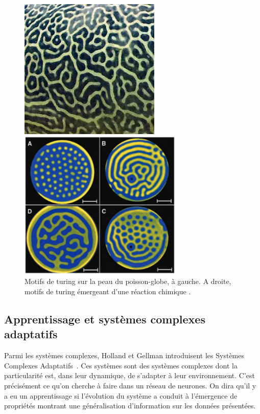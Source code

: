 \begin{figure}
\begin{minipage}{0.5\textwidth}
\centering
\includegraphics[width=0.6\textwidth]{220px-Giant_Pufferfish_skin_pattern_detail.jpg}
\end{minipage}
\begin{minipage}{0.5\textwidth}
\centering
\includegraphics[width=0.7\textwidth]{turing_pattern_chem.pdf}
\end{minipage}
\caption{Motifs de turing sur la peau du poisson-globe, à gauche. A droite, motifs de turing émergeant d'une réaction chimique \cite{Horvth2009AnED}.}
\label{fig:turing_pattern}
\end{figure}

\subsection{Apprentissage et systèmes complexes adaptatifs}

Parmi les systèmes complexes, Holland et Gellman introduisent les Systèmes Complexes Adaptatifs~\cite{complex_adaptative_systemes}. Ces systèmes sont des systèmes complexes dont la particularité est, dans leur dynamique, de s'adapter à leur environnement. C'est précisément ce qu'on cherche à faire dans un réseau de neurones. On dira qu'il y a eu un apprentissage si l'évolution du système a conduit à l'émergence de propriétés montrant une généralisation d'information sur les données présentées. 

